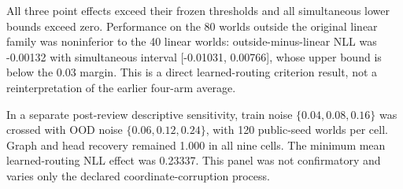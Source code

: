All three point effects exceed their frozen thresholds and all simultaneous
lower bounds exceed zero.  Performance on the 80 worlds outside the original
linear family was noninferior to the 40 linear worlds: outside-minus-linear NLL
was -0.00132 with simultaneous interval [-0.01031, 0.00766], whose upper bound
is below the 0.03 margin.  This is a direct learned-routing criterion result,
not a reinterpretation of the earlier four-arm average.

In a separate post-review descriptive sensitivity, train noise
\(\{0.04,0.08,0.16\}\) was crossed with OOD noise
\(\{0.06,0.12,0.24\}\), with 120 public-seed worlds per cell.  Graph and head
recovery remained 1.000 in all nine cells.  The minimum mean learned-routing
NLL effect was 0.23337.  This panel was not confirmatory and varies only the
declared coordinate-corruption process.
